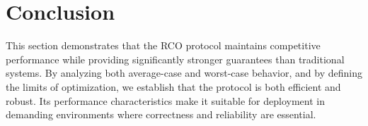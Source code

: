 \section{Conclusion}

This section demonstrates that the RCO protocol maintains competitive performance while providing significantly stronger guarantees than traditional systems. By analyzing both average-case and worst-case behavior, and by defining the limits of optimization, we establish that the protocol is both efficient and robust. Its performance characteristics make it suitable for deployment in demanding environments where correctness and reliability are essential.